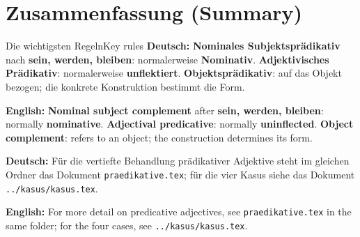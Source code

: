 \documentclass[a4paper,11pt]{article}
\newcommand{\GermanText}[1]{\textbf{Deutsch: }#1\par}
\newcommand{\EnglishText}[1]{{\small\color{SoftGray}\textbf{English: }#1\par}}
\begin{document}
\section{Zusammenfassung \textnormal{(Summary)}}
\begin{grammarentry}{Die wichtigsten Regeln}{Key rules}
\GermanText{\textbf{Nominales Subjektsprädikativ} nach \textbf{sein, werden, bleiben}: normalerweise \textbf{Nominativ}. \textbf{Adjektivisches Prädikativ}: normalerweise \textbf{unflektiert}. \textbf{Objektsprädikativ}: auf das Objekt bezogen; die konkrete Konstruktion bestimmt die Form.}
\EnglishText{\textbf{Nominal subject complement} after \textbf{sein, werden, bleiben}: normally \textbf{nominative}. \textbf{Adjectival predicative}: normally \textbf{uninflected}. \textbf{Object complement}: refers to an object; the construction determines its form.}
\GermanText{Für die vertiefte Behandlung prädikativer Adjektive steht im gleichen Ordner das Dokument \texttt{praedikative.tex}; für die vier Kasus siehe das Dokument \texttt{../kasus/kasus.tex}.}
\EnglishText{For more detail on predicative adjectives, see \texttt{praedikative.tex} in the same folder; for the four cases, see \texttt{../kasus/kasus.tex}.}
\end{grammarentry}
\end{document}
